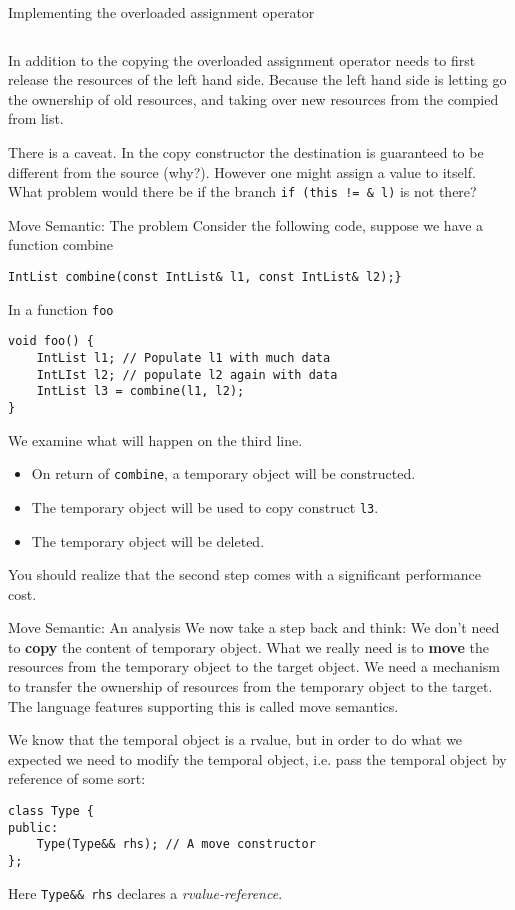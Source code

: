 \begin{frame}{Implementing the overloaded assignment operator}
\inputminted[fontsize=\small,firstline=44,lastline=50]{c++}{code/Linked-List/IntList.cpp}

In addition to the copying the overloaded assignment operator needs to first release the resources of the left hand side. Because the left hand side is letting go the ownership of old resources, and taking over new resources from the compied from list.

There is a caveat. In the copy constructor the destination is guaranteed to be different from the source (why?). \alert{However one might assign a value to itself.} What problem would there be if the branch \texttt{if (this != \& l)} is not there? 
\end{frame}



\begin{frame}[fragile]{Move Semantic: The problem}
Consider the following code, suppose we have a function combine
\begin{verbatim}
IntList combine(const IntList& l1, const IntList& l2);}
\end{verbatim}
In a function \texttt{foo} 
\begin{verbatim}
void foo() {
	IntList l1; // Populate l1 with much data
	IntLIst l2; // populate l2 again with data
	IntList l3 = combine(l1, l2);
}
\end{verbatim}
We examine what will happen on the third line.
\begin{itemize}
	\item On return of \texttt{combine}, a temporary object will be constructed.
	\item The temporary object will be used to copy construct \texttt{l3}.
	\item The temporary object will be deleted.
\end{itemize}
You should realize that the second step comes with a significant performance cost.
\end{frame}

\begin{frame}[fragile]{Move Semantic: An analysis}
We now take a step back and think: We don't need to \textbf{copy} the content of temporary object. What we really need is to \textbf{move} the resources from the temporary object to the target object. We need a mechanism to transfer the ownership of resources from the temporary object to the target. The language features supporting this is called move semantics.

\vspace{0.1in}
We know that the temporal object is a rvalue, but in order to do what we expected we need to modify the temporal object, i.e. pass the temporal object by reference of some sort:

\begin{verbatim}
class Type {
public:
    Type(Type&& rhs); // A move constructor
};
\end{verbatim}
Here \texttt{Type\&\& rhs} declares a \textit{rvalue-reference}.
\end{frame}

